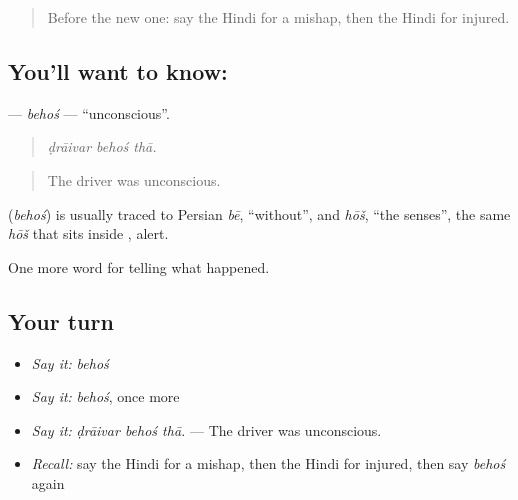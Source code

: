 \label{lesson:HI-C298-behos}



\begin{quote}
Before the new one: say the Hindi for a mishap, then the Hindi for injured.
\end{quote}

\subsection*{You'll want to know: }
\textbf{} — \emph{behoś} — \textquotedblleft{}unconscious\textquotedblright{}.

\begin{quote}
  
\end{quote}

\begin{quote}
\emph{ḍrāivar behoś thā.}
\end{quote}

\begin{quote}
The driver was unconscious.
\end{quote}

\begin{cousinweb}
\textbf{} (\emph{behoś}) is usually traced to Persian \emph{bē}, \textquotedblleft{}without\textquotedblright{}, and \emph{hōš}, \textquotedblleft{}the senses\textquotedblright{}, the same \emph{hōš} that sits inside \textbf{}, alert.
\end{cousinweb}

\begin{grammarlens}[title={What you've built}]
One more word for telling what happened.
\end{grammarlens}

\subsection*{Your turn}
\begin{itemize}
\raggedright
  \item \emph{Say it:} \emph{behoś}
  \item \emph{Say it:} \emph{behoś}, once more
  \item \emph{Say it:} \emph{ḍrāivar behoś thā.} — The driver was unconscious.
  \item \emph{Recall:} say the Hindi for a mishap, then the Hindi for injured, then say \emph{behoś} again
\end{itemize}

